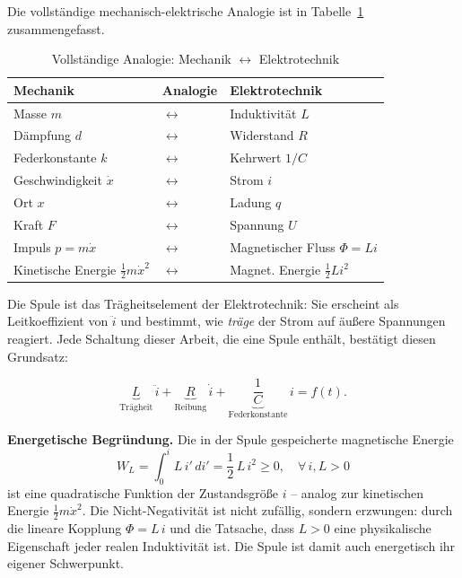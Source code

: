 ﻿\documentclass[12pt, a4paper]{article}
\begin{document}
	Die vollständige mechanisch-elektrische Analogie ist in Tabelle~\ref{tab:analogie}
	zusammengefasst.
	
	\begin{table}[h]
		\centering
		\caption{Vollständige Analogie: Mechanik $\longleftrightarrow$ Elektrotechnik}
		\begin{tabular}{>{\centering\arraybackslash}p{4cm}
				>{\centering\arraybackslash}p{2cm}
				>{\centering\arraybackslash}p{4cm}}
			\toprule
			\textbf{Mechanik} & \textbf{Analogie} & \textbf{Elektrotechnik} \\
			\midrule
			Masse $m$ & $\longleftrightarrow$ & Induktivität $L$ \\
			Dämpfung $d$ & $\longleftrightarrow$ & Widerstand $R$ \\
			Federkonstante $k$ & $\longleftrightarrow$ & Kehrwert $1/C$ \\
			Geschwindigkeit $\dot{x}$ & $\longleftrightarrow$ & Strom $i$ \\
			Ort $x$ & $\longleftrightarrow$ & Ladung $q$ \\
			Kraft $F$ & $\longleftrightarrow$ & Spannung $U$ \\
			Impuls $p = m\dot{x}$ & $\longleftrightarrow$ & Magnetischer Fluss $\Phi = Li$ \\
			Kinetische Energie $\tfrac{1}{2}m\dot{x}^2$ & $\longleftrightarrow$ &
			Magnet. Energie $\tfrac{1}{2}Li^2$ \\
			\bottomrule
		\end{tabular}
		\label{tab:analogie}
	\end{table}
	
	Die Spule ist das Trägheitselement der Elektrotechnik: Sie erscheint als
	Leitkoeffizient von $\ddot{i}$ und bestimmt, wie \emph{träge} der Strom auf
	äußere Spannungen reagiert. Jede Schaltung dieser Arbeit, die eine Spule
	enthält, bestätigt diesen Grundsatz:
	
	\begin{equation}
		\underbrace{L}_{\mathrm{Trägheit}}\,\ddot{i}
		+ \underbrace{R}_{\mathrm{Reibung}}\,\dot{i}
		+ \underbrace{\frac{1}{C}}_{\mathrm{Federkonstante}}\,i = f(t).
	\end{equation}
	
	\textbf{Energetische Begründung.}
	Die in der Spule gespeicherte magnetische Energie
	\begin{equation}
		W_L = \int_0^{i} L\,i'\,di' = \frac{1}{2}\,L\,i^2 \geq 0, \quad \forall\, i, L > 0
	\end{equation}
	ist eine quadratische Funktion der Zustandsgröße $i$ -- analog zur kinetischen
	Energie $\tfrac{1}{2}m\dot{x}^2$. Die Nicht-Negativität ist nicht zufällig,
	sondern erzwungen: durch die lineare Kopplung $\Phi = L\,i$ und die Tatsache,
	dass $L > 0$ eine physikalische Eigenschaft jeder realen Induktivität ist.
	Die Spule ist damit auch energetisch ihr eigener Schwerpunkt.
	
\end{document}
